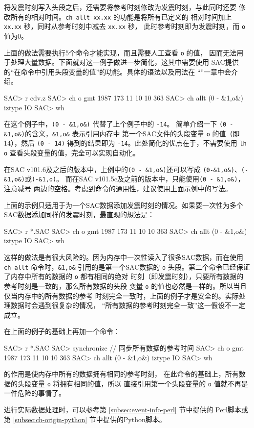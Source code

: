 将发震时刻写入头段之后，还需要将参考时刻修改为发震时刻，与此同时还要
修改所有的相对时间。\texttt{ch allt xx.xx} 的功能是将所有已定义的
相对时间加上 \texttt{xx.xx} 秒，同时从参考时刻中减去 \texttt{xx.xx} 秒，
此时参考时刻即为发震时刻，而 \texttt{o} 值为0。

上面的做法需要执行5个命令才能实现，而且需要人工查看 \texttt{o} 的值，
因而无法用于处理大量数据。下面就对这一例子做进一步简化，这其中需要使用
SAC提供的``在命令中引用头段变量的值''的功能。具体的语法以及用法在
``''一章中会介绍。
\begin{SACCode}
SAC> r cdv.z
SAC> ch o gmt 1987 173 11 10 10 363
SAC> ch allt (0 - &1,o&) iztype IO
SAC> wh
\end{SACCode}
在这个例子中，\verb|(0 - &1,o&)| 代替了上个例子中的 \texttt{-14}。
简单介绍一下 \verb|(0 - &1,o&)|的含义，\verb|&1,o&| 表示引用内存中
第一个SAC文件的头段变量 \texttt{o} 的值（即14），然后 \verb|(0 - 14)|
得到的结果即为 \texttt{-14}。此处简化的优点在于，不需要使用 \texttt{lh o}
查看头段变量的值，完全可以实现自动化。

\begin{note}
在SAC v101.6及之后的版本中，上例中的\verb|(0 - &1,o&)|还可以写成
\verb|(0-&1,o&)|、\verb|(-&1,o&)|或\verb|(-&1,o)|。
而在SAC v101.5c及之前的版本中，只能使用\verb|(0 - &1,o&)|，注意减号
两边的空格。考虑到命令的通用性，建议使用上面示例中的写法。
\end{note}

上面的示例只适用于为一个SAC数据添加发震时刻的情况。如果要一次性为多个
SAC数据添加同样的发震时刻，最直观的想法是：
\begin{SACCode}
SAC> r *.SAC
SAC> ch o gmt 1987 173 11 10 10 363
SAC> ch allt (0 - &1,o&) iztype IO
SAC> wh
\end{SACCode}
这样的做法是有很大风险的。因为内存中一次性读入了很多SAC数据，而在使用
\verb|ch allt| 命令时，\verb|&1,o&| 引用的是第一个SAC数据的 \texttt{o}
头段。第二个命令已经保证了内存中所有的数据的 \texttt{o} 都有相同的绝对
时刻（即发震时刻），只要所有数据的参考时刻是一致的，那么所有数据的头段
变量 \texttt{o} 的值也必然是一样的。所以当且仅当内存中的所有数据的参考
时刻完全一致时，上面的例子才是安全的。实际处理数据时会遇到很复杂的情况，
``所有数据的参考时刻完全一致''这一假设不一定成立。

在上面的例子的基础上再加一个命令：
\begin{SACCode}
SAC> r *.SAC
SAC> synchronize            // 同步所有数据的参考时间
SAC> ch o gmt 1987 173 11 10 10 363
SAC> ch allt (0 - &1,o&) iztype IO
SAC> wh
\end{SACCode}
 的作用是使内存中所有的数据拥有相同的参考时刻，
在此命令的基础上，所有数据的头段变量 \texttt{o} 将拥有相同的值，所以
直接引用第一个头段变量的 \texttt{o} 值就不再是一件危险的事情了。

进行实际数据处理时，可以参考第 \ref{subsec:event-info-perl} 节中提供的
Perl脚本或第 \ref{subsec:ch-origin-python} 节中提供的Python脚本。
